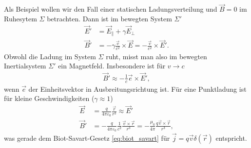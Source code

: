 Als Beispiel wollen wir den Fall einer statischen Ladungsverteilung und $\vec B=0$ im Ruhesytem $\Sigma$ betrachten. Dann ist im bewegten System $\Sigma'$
\begin{align*}
    \vec E' & =\vec E_\parallel + \gamma \vec E_\perp                                      \\
    \vec B' & =-\gamma\frac{\vec v}{c^2}\times \vec E = -\frac{\vec v}{c^2}\times \vec E'.
\end{align*}
Obwohl die Ladung im System $\Sigma$ ruht, misst man also im bewegten Inertialsystem $\Sigma'$ ein Magnetfeld.
Insbesondere ist für $v\rightarrow c$
\begin{align*}
    \vec B'\approx -\frac{1}{c}\vec e\times\vec E',
\end{align*}
wenn $\vec e$ der Einheitsvektor in Ausbreitungsrichtung ist. Für eine Punktladung ist für kleine Geschwindigkeiten ($\gamma\approx 1$)
\begin{align*}
    \vec E & = \frac{q}{4\pi\varepsilon_0} \frac{\vec r}{r^3} \approx \vec E' \\
    \vec B' &= - \frac{q}{4\pi\varepsilon_0} \frac{1}{c^2}\frac{\vec v\times\vec r}{r^3}=-\frac{\mu_0}{4\pi} \frac{q\vec v\times \vec r}{r^3},
\end{align*}
was gerade dem Biot-Savart-Gesetz \eqref{eq:biot_savart} für $\vec j=q\vec v\delta(\vec r)$ entspricht.

